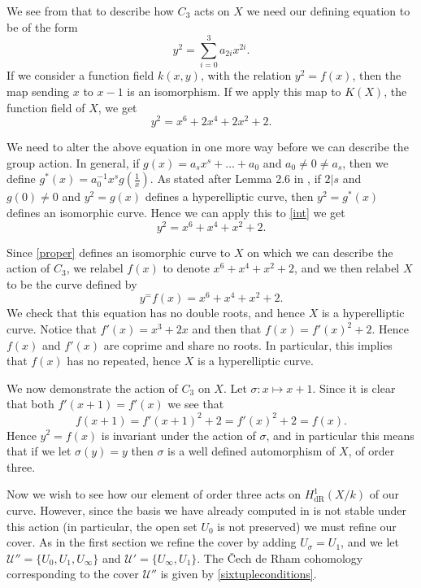 \documentclass[draft, 11pt]{article} %
\theoremstyle{plain}
\theoremstyle{remark}
\newcommand{\cU}{{\mathcal U}}
\newcommand{\cech}{\v{C}ech }
\newcommand{\derhamhone}{H_{\text {dR}}^1(X/k)}
\begin{document}
We see from \cite[\S 3.3]{automorphismshyperellipticmodular} that to describe how $C_3$ acts on $X$ we need our defining equation to be of the form
\[
y^2 = \sum_{i=0}^3 a_{2i}x^{2i}.
\]
If we consider a function field $k(x,y)$, with the relation $y^2=f(x)$, then the map sending $x$ to $x-1$ is an isomorphism.
If we apply this map to $K(X)$, the function field of $X$, we get 
\begin{equation}\label{int}
y^2 = x^6 + 2x^4 + 2x^2 + 2.
\end{equation}


We need to alter the above equation in one more way before we can describe the group action.
In general, if $g(x) = a_sx^s + \ldots + a_0$ and $a_0 \neq 0 \neq a_s$, then we define $g^*(x) = a_0^{-1}x^s g\left( \frac{1}{x} \right)$.
As stated after Lemma 2.6 in \cite{automorphismshyperellipticmodular}, if $2|s$ and $g(0) \neq 0$ and $y^2 = g(x)$ defines a hyperelliptic curve, then $y^2 = g^*(x)$ defines an isomorphic curve.
Hence we can apply this to \eqref{int} we get 
\begin{equation}\label{proper}
y^2 = x^6 + x^4 + x^2 + 2.
\end{equation}

Since \eqref{proper} defines an isomorphic curve to $X$ on which we can describe the action of $C_3$, we relabel $f(x)$ to denote $x^6 + x^4 + x^2 + 2$, and we then relabel $X$ to be the curve defined by 
\[
y^ = f(x) = x^6 + x^4 + x^2 + 2.
\]
We check that this equation has no double roots, and hence $X$ is a hyperelliptic curve.
Notice that $f'(x) = x^3 + 2x$ and then that $f(x) = f'(x)^2 + 2$.
Hence $f(x)$ and $f'(x)$ are coprime and share no roots.
In particular, this implies that $f(x)$ has no repeated, hence $X$ is a hyperelliptic curve.

We now demonstrate the action of $C_3$ on $X$.
Let $\sigma :x \mapsto x+1$.
Since it is clear that both $f'(x+1) = f'(x)$ we see that
\[
f(x+1) = f'(x+1)^2 + 2 = f'(x)^2 + 2 = f(x).
\]
Hence $y^2 = f(x)$ is invariant under the action of $\sigma$, and in particular this means that if we let $\sigma(y) = y$ then $\sigma$ is a well defined automorphism of $X$, of order three.


Now we wish to see how our element of order three acts on $\derhamhone$ of our curve.
However, since the basis we have already computed in \cite[Thm. 2.3]{derhamactions} is not stable under this action (in particular, the open set $U_0$ is not preserved) we must refine our cover.
As in the first section we refine the cover by adding $U_\sigma = U_1$, and we let $\cU'' = \{U_0, U_1, U_\infty\}$ and $\cU' = \{U_\infty, U_1\}$.
The \cech de Rham cohomology corresponding to the cover $\cU''$ is given by \eqref{sixtupleconditions}.
\end{document}
